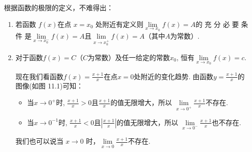 根据函数的极限的定义，不难得出：
\begin{enumerate}
    \item 若函数 $f(x)$在点 $x=x_0$ 处附近有定义则$\lim\limits_{x\to x_{0}}f(x)=A$的 充 分 必 要 条 件 是$\lim\limits _{x\to x^-_0 }f( x) = A$且$\lim\limits_{x\to x^+_0}f(x)=A$（其中$A$为常数）.
    \item 对于函数$f(x)=C$（$C$为常数）及任一给定的常数$x_0$, 恒有$\lim\limits_{x\to x_0}f(x)=c$.
    
现在我们看函数$f(x)=\frac{x+1}{x}$在点$x=0$处附近的变化趋势. 由函数$y=\frac{x+1}{x}$的图像(如图 11.1)可知：
\begin{itemize}
\item 当$x\to0^{+}$时, $\frac{x+1}x>0$且$\frac{x+1}x$的值无限增大，所以
$\lim\limits_{x\to0^+}\frac{x+1}x$不存在.
\item 
当$x\to0^{-1}$时, $\frac{x+1}x<0$且$\left|\frac{x+1}x\right|$的值无限增大，所以
$\lim\limits_{x\to0^-}\frac{x+1}x$也不存在.
\end{itemize}
我们也可以说当 $x\to0$ 时，$\lim\limits_{x\to0}\frac{x+1}x$不存在.
\end{enumerate}

